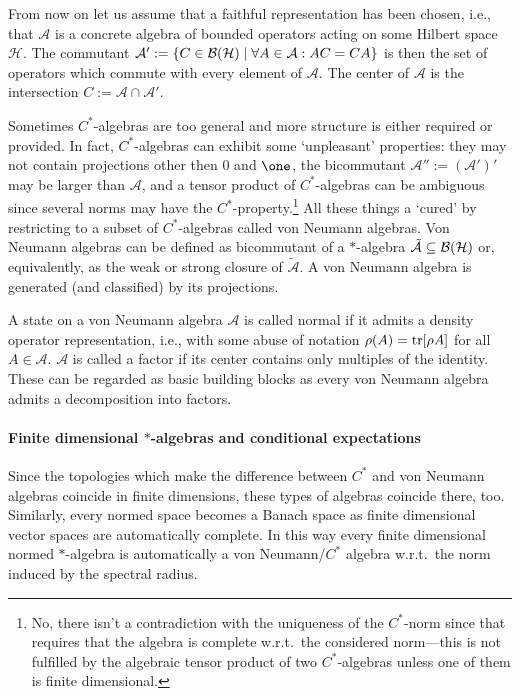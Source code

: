 \documentclass[11pt,a4paper]{article}
\theoremstyle{plain}
\theoremstyle{definition}
\theoremstyle{remark}
\numberwithin{equation}{section}
\begin{document}
From now on let us assume that a faithful representation has been chosen, i.e., that $\mathcal{A}$ is a concrete algebra of bounded operators acting on some Hilbert space $\mathcal{H}$. The commutant $\mathcal{A}':=\{C\in \mathcal{B}(\mathcal{H})\mid \forall A\in \mathcal{A}: AC=CA\}$ is then the set of operators which commute with every element of $\mathcal{A}$. The center of $\mathcal{A}$ is the intersection $C:=\mathcal{A}\cap \mathcal{A}'$.

Sometimes $C^\ast$-algebras are too general and more structure is either required or provided. In fact, $C^\ast$-algebras can exhibit some `unpleasant' properties: they may not contain projections other then $0$ and $\one$, the bicommutant $\mathcal{A}'':=(\mathcal{A}')'$ may be larger than $\mathcal{A}$, and a tensor product of $C^\ast$-algebras can be ambiguous since several norms may have the $C^\ast$-property.\footnote{No, there isn't a contradiction with the uniqueness of the $C^\ast$-norm since that requires that the algebra is complete w.r.t.\ the considered norm---this is not fulfilled by the algebraic tensor product of two $C^\ast$-algebras unless one of them is finite dimensional.} All these things a `cured' by restricting to a subset of $C^\ast$-algebras called von Neumann algebras. Von Neumann algebras can be defined as bicommutant of a $\ast$-algebra $\tilde{\mathcal{A}}\subseteq \mathcal{B}(\mathcal{H})$ or, equivalently, as the weak or strong closure of $\tilde{\mathcal{A}}$. A von Neumann algebra is generated (and classified) by its projections.

A state on a von Neumann algebra $\mathcal{A}$ is called normal if it admits a density operator representation, i.e., with some abuse of notation $\rho(A)=\operatorname{tr}[\rho A]$ for all $A\in \mathcal{A}$. $\mathcal{A}$ is called a factor if its center contains only multiples of the identity. These can be regarded as basic building blocks as every von Neumann algebra admits a decomposition into factors.

\paragraph{Finite dimensional $\ast$-algebras and conditional expectations}
Since the topologies which make the difference between $C^\ast$ and von Neumann algebras coincide in finite dimensions, these types of algebras coincide there, too. Similarly, every normed space becomes a Banach space as finite dimensional vector spaces are automatically complete. In this way every finite dimensional normed $\ast$-algebra is automatically a von Neumann/$C^\ast$ algebra w.r.t.\ the norm induced by the spectral radius.
\end{document}
